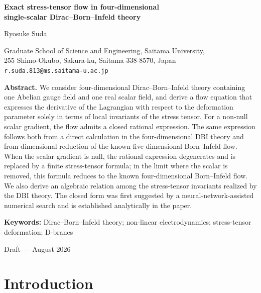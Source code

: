 \documentclass[a4paper,11pt]{article}
\numberwithin{equation}{section}
\begin{document}
\begin{titlepage}
\thispagestyle{empty}
\begin{center}
\vspace*{22mm}
{\Large\bfseries Exact stress-tensor flow in four-dimensional\\[2mm]
single-scalar Dirac--Born--Infeld theory\par}
\vspace{16mm}
{\large Ryosuke Suda\par}
\vspace{4mm}
{\normalsize
Graduate School of Science and Engineering, Saitama University,\\
255 Shimo-Okubo, Sakura-ku, Saitama 338-8570, Japan\\[1mm]
\texttt{r.suda.813@ms.saitama-u.ac.jp}\par}
\vspace{18mm}
\end{center}

\noindent\textbf{Abstract.}
We consider four-dimensional Dirac--Born--Infeld theory containing one Abelian gauge field and one real scalar field, and derive a flow equation that expresses the derivative of the Lagrangian with respect to the deformation parameter solely in terms of local invariants of the stress tensor. For a non-null scalar gradient, the flow admits a closed rational expression. The same expression follows both from a direct calculation in the four-dimensional DBI theory and from dimensional reduction of the known five-dimensional Born--Infeld flow. When the scalar gradient is null, the rational expression degenerates and is replaced by a finite stress-tensor formula; in the limit where the scalar is removed, this formula reduces to the known four-dimensional Born--Infeld flow. We also derive an algebraic relation among the stress-tensor invariants realized by the DBI theory. The closed form was first suggested by a neural-network-assisted numerical search and is established analytically in the paper.

\vspace{8mm}
\noindent\textbf{Keywords:} Dirac--Born--Infeld theory; non-linear electrodynamics; stress-tensor deformation; D-branes

\vfill
\begin{center}
Draft --- August 2026
\end{center}
\end{titlepage}

\setcounter{page}{1}

\section{Introduction}
\end{document}
